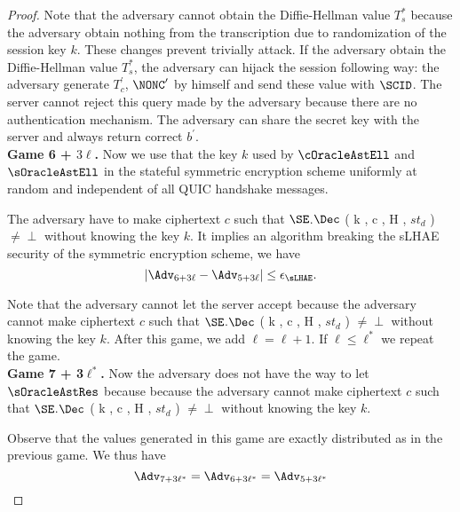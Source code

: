 \begin{proof}
 Note that the adversary cannot obtain the Diffie-Hellman value $T_s^{\ast}$ because the adversary obtain nothing from the transcription due to randomization of the session key $k$. These changes prevent trivially attack. If the adversary obtain the Diffie-Hellman value $T_s^{\ast}$, the adversary can hijack the session following way: the adversary generate $T_c^{\prime}$, $\NONC^{\prime}$ by himself and send these value with $\SCID$. The server cannot reject this query made by the adversary because there are no authentication mechanism. The adversary can share the secret key with the server and always return correct $b^{\prime}$.
\vspace{10pt}\\%
%
%
 \textbf{Game 6 + $3\ell$.} Now we use that the key $k$ used by $\cOracleAstEll$ and $\sOracleAstEll$ in the stateful symmetric encryption scheme uniformly at random and independent of all QUIC handshake messages.

 The adversary have to make ciphertext $c$ such that $\SE$.$\Dec$ ( k , c , H , $st_d$ ) $\neq \perp$ without knowing the key $k$. It implies an algorithm breaking the sLHAE security of the symmetric encryption scheme, we have
 \begin{equation}
  |\Adv_{6 + 3\ell} - \Adv_{5 + 3\ell} | \leq \epsilon_{\sLHAE}.
 \end{equation}%

 Note that the adversary cannot let the server accept because the adversary cannot make ciphertext $c$ such that $\SE$.$\Dec$ ( k , c , H , $st_d$ ) $\neq \perp$ without knowing the key $k$.
 After this game, we add $\ell = \ell + 1$. If $\ell \leq \ell^{\ast}$ we repeat the game.
\vspace{10pt}\\%
%
%
 \textbf{Game 7 + 3$\ell^{\ast}$.} Now the adversary does not have the way to let $\sOracleAstRes$ because because the adversary cannot make ciphertext $c$ such that $\SE$.$\Dec$ ( k , c , H , $st_d$ ) $\neq \perp$ without knowing the key $k$.

 Observe that the values generated in this game are exactly distributed as in the previous game. We thus have
 \begin{equation}
  \Adv_{7 + 3\ell^{\ast}} = \Adv_{6 + 3\ell^{\ast}} = \Adv_{5 + 3\ell^{\ast}}
 \end{equation}%
%
%
\end{proof}